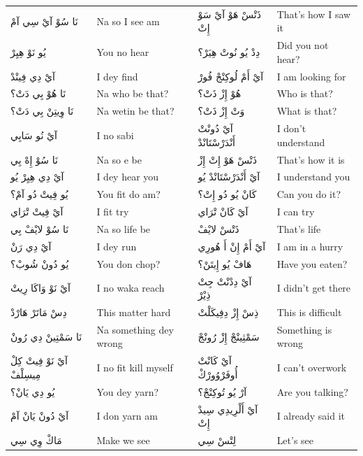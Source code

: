 \documentclass[12pt]{article}
\begin{document}
\begin{longtable}{p{3.2cm} p{3.2cm} p{3.2cm} p{3.2cm}}
نَا سُوْ آيْ سِي آمْ & Na so I see am & ذَتْسْ هَوْ آيْ سَوْ إِتْ & That’s how I saw it \\
يُو نَوْ هِيِرْ & You no hear & دِدْ يُو نُوتْ هِيَرْ؟ & Did you not hear? \\
آيْ دِي فِينْدْ & I dey find & آيْ أَمْ لُوكِنْجْ فُورْ & I am looking for \\
نَا هُوْ بِي دَتْ؟ & Na who be that? & هُوْ إِزْ ذَتْ؟ & Who is that? \\
نَا وِيتِنْ بِي دَتْ؟ & Na wetin be that? & وَتْ إِزْ ذَتْ؟ & What is that? \\
آيْ نُو سَابِي & I no sabi & آيْ دُونْتْ أَنْدَرْسْتَانْدْ & I don’t understand \\
نَا سُوْ إِهْ بِي & Na so e be & ذَتْسْ هَوْ إِتْ إِزْ & That’s how it is \\
آيْ دِي هِيِرْ يُو & I dey hear you & آيْ أَنْدَرْسْتَانْدْ يُو & I understand you \\
يُو فِيتْ دُو آمْ؟ & You fit do am? & كَانْ يُو دُو إِتْ؟ & Can you do it? \\
آيْ فِيتْ تْرَاي & I fit try & آيْ كَانْ تْرَاي & I can try \\
نَا سُوْ لايْفْ بِي & Na so life be & ذَتْسْ لايْفْ & That’s life \\
آيْ دِي رَنْ & I dey run & آيْ أَمْ إِنْ أَ هُورِي & I am in a hurry \\
يُو دُونْ شُوبْ؟ & You don chop? & هَافْ يُو إِيتَنْ؟ & Have you eaten? \\
آيْ نَوْ وَاكَا رِيتْ & I no waka reach & آيْ دِدْنْتْ جِتْ ذِيْرْ & I didn’t get there \\
دِسْ مَاتَرْ هَارْدْ & This matter hard & ذِسْ إِزْ دِفِيكَلْتْ & This is difficult \\
نَا سَمْتِينْ دِي رُونْ & Na something dey wrong & سَمْثِينْجْ إِزْ رُونْجْ & Something is wrong \\
آيْ نَوْ فِيتْ كِلْ مِيسِلْفْ & I no fit kill myself & آيْ كَانْتْ أُوفَرْوُورْكْ & I can’t overwork \\
يُو دِي يَانْ؟ & You dey yarn? & آرْ يُو تُوكِنْجْ؟ & Are you talking? \\
آيْ دُونْ يَانْ آمْ & I don yarn am & آيْ أَلْرِيدِي سِيدْ إِتْ & I already said it \\
مَاكْ وِي سِي & Make we see & لِتْسْ سِي & Let’s see \\


\end{longtable}
\end{document}
